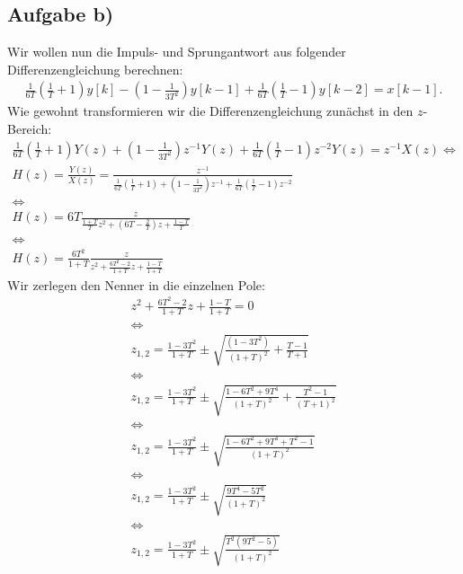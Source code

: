 \documentclass[11pt,a4paper,DIV=12]{scrartcl}
\begin{document}
\subsection{Aufgabe b)}
Wir wollen nun die Impuls- und Sprungantwort aus folgender Differenzengleichung berechnen:
\begin{gather}
	\frac{1}{6T}\left(\frac{1}{T}+1\right)y[k]-\left(1-\frac{1}{3T^2}\right)y[k-1]+\frac{1}{6T}\left(\frac{1}{T}-1\right)y[k-2]=x[k-1].
\end{gather}
Wie gewohnt transformieren wir die Differenzengleichung zunächst in den $z$-Bereich:
\begin{gather}
	\frac{1}{6T}\left(\frac{1}{T}+1\right)Y(z)+\left(1-\frac{1}{3T^2}\right)z^{-1}Y(z)+\frac{1}{6T}\left(\frac{1}{T}-1\right)z^{-2}Y(z)=z^{-1}X(z)
	\Longleftrightarrow\nonumber\\
	H(z)=\frac{Y(z)}{X(z)}=\frac{z^{-1}}{\frac{1}{6T}\left(\frac{1}{T}+1\right)+\left(1-\frac{1}{3T^2}\right)z^{-1}+\frac{1}{6T}\left(\frac{1}{T}-1\right)z^{-2}}\\
	\Longleftrightarrow\nonumber\\
	H(z)=6T\frac{z}{\frac{1+T}{T}z^2+\left(6T-\frac{2}{T}\right)z+\frac{1-T}{T}}\\
	\Longleftrightarrow\nonumber\\
	H(z)=\frac{6T^2}{1+T}\frac{z}{z^2+\frac{6T^2-2}{1+T}z+\frac{1-T}{1+T}}
\end{gather}
Wir zerlegen den Nenner in die einzelnen Pole:
\begin{gather}
	z^2+\frac{6T^2-2}{1+T}z+\frac{1-T}{1+T}=0\\
	\Longleftrightarrow\nonumber\\
	z_{1,2}=\frac{1-3T^2}{1+T}\pm\sqrt{\frac{(1-3T^2)}{(1+T)^2}+\frac{T-1}{T+1}}\\
	\Longleftrightarrow\nonumber\\
	z_{1,2}=\frac{1-3T^2}{1+T}\pm\sqrt{\frac{1-6T^2+9T^4}{(1+T)^2}+\frac{T^2-1}{(T+1)^2}}\\
	\Longleftrightarrow\nonumber\\
	z_{1,2}=\frac{1-3T^2}{1+T}\pm\sqrt{\frac{1-6T^2+9T^4+T^2-1}{(1+T)^2}}\\
	\Longleftrightarrow\nonumber\\
	z_{1,2}=\frac{1-3T^2}{1+T}\pm\sqrt{\frac{9T^4-5T^2}{(1+T)^2}}\\
	\Longleftrightarrow\nonumber\\
	z_{1,2}=\frac{1-3T^2}{1+T}\pm\sqrt{\frac{T^2(9T^2-5)}{(1+T)^2}}\\
\end{gather}
\end{document}
